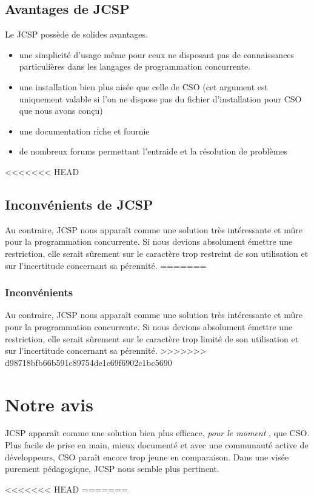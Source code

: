 \documentclass[a4paper,11pt,french]{report}
\begin{document}
\subsection{Avantages de JCSP}
Le JCSP possède de solides avantages. 
\begin{itemize}
\item une simplicité d'usage m\^eme pour ceux ne disposant pas de connaissances particulières dans les langages de programmation concurrente.
\item une installation bien plus aisée que celle de CSO (cet argument est uniquement valable si l'on ne dispose pas du fichier d'installation pour CSO que nous avons conçu)
\item une documentation riche et fournie
\item de nombreux forums permettant l'entraide et la résolution de problèmes
\end{itemize}

<<<<<<< HEAD
\subsection{Inconvénients de JCSP}
Au contraire, JCSP nous appara\^it comme une solution très intéressante et m\^ure pour la programmation concurrente. Si nous devions absolument émettre une restriction, elle serait s\^urement sur le caractère trop restreint de son utilisation et sur l'incertitude concernant sa pérennité.
=======
\subsubsection{Inconvénients}
Au contraire, JCSP nous appara\^it comme une solution très intéressante et m\^ure pour la programmation concurrente. Si nous devions absolument émettre une restriction, elle serait s\^urement sur le caractère trop limité de son utilisation et sur l'incertitude concernant sa pérennité.
>>>>>>> d98718bfb66b591c89754de1c69f6902c1bc5690

\section{Notre avis}
JCSP appara\^it comme une solution bien plus efficace, \textit{pour le moment} , que CSO. Plus facile de prise en main, mieux documenté et avec une communauté active de développeurs, CSO para\^it encore trop jeune en comparaison. Dans une visée purement pédagogique, JCSP nous semble plus pertinent. 

<<<<<<< HEAD
=======
\end{document}
